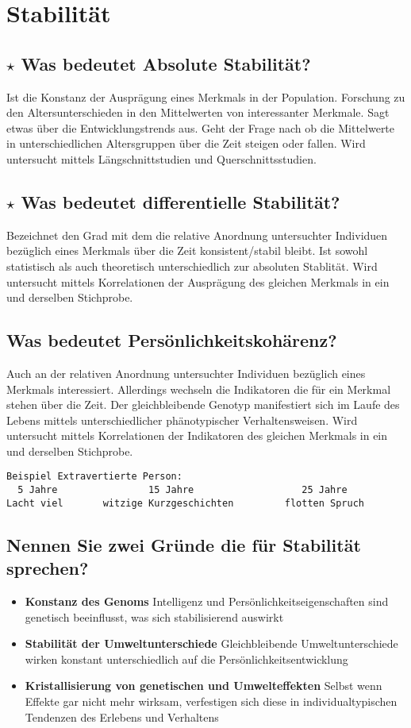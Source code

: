 \documentclass[a4paper,9pt,DIV=14]{scrartcl}
\begin{document}
\section{Stabilität}
\subsection{$\star$ Was bedeutet Absolute Stabilität?} %
Ist die Konstanz der Ausprägung eines Merkmals in der Population. Forschung zu den Altersunterschieden in den Mittelwerten von interessanter Merkmale. Sagt etwas über die Entwicklungstrends aus. Geht der Frage nach ob die Mittelwerte in unterschiedlichen Altersgruppen über die Zeit steigen oder fallen. Wird untersucht mittels Längschnittstudien und Querschnittsstudien.
\subsection{$\star$ Was bedeutet differentielle Stabilität?} %
Bezeichnet den Grad mit dem die relative Anordnung untersuchter Individuen bezüglich eines Merkmals über die Zeit konsistent/stabil bleibt. Ist sowohl statistisch als auch theoretisch unterschiedlich zur absoluten Stablität. Wird untersucht mittels Korrelationen der Ausprägung des gleichen Merkmals in ein und derselben Stichprobe.
\subsection{Was bedeutet Persönlichkeitskohärenz?}
Auch an der relativen Anordnung untersuchter Individuen bezüglich eines Merkmals interessiert. Allerdings wechseln die Indikatoren die für ein Merkmal stehen über die Zeit. Der gleichbleibende Genotyp manifestiert sich im Laufe des Lebens mittels unterschiedlicher phänotypischer Verhaltensweisen. Wird untersucht mittels Korrelationen der Indikatoren des gleichen Merkmals in ein und derselben Stichprobe.
\begin{Verbatim}[samepage=true, frame=single]
Beispiel Extravertierte Person:
  5 Jahre                15 Jahre                   25 Jahre
Lacht viel       witzige Kurzgeschichten         flotten Spruch
\end{Verbatim}
\subsection{Nennen Sie zwei Gründe die für Stabilität sprechen?}
\begin{itemize}
    \item \textbf{Konstanz des Genoms}
    Intelligenz und Persönlichkeitseigenschaften sind genetisch beeinflusst, was sich
    stabilisierend auswirkt
    \item \textbf{Stabilität der Umweltunterschiede}
    Gleichbleibende Umweltunterschiede wirken konstant unterschiedlich auf die
    Persönlichkeitsentwicklung
    \item \textbf{Kristallisierung von genetischen und Umwelteffekten}
    Selbst wenn Effekte gar nicht mehr wirksam, verfestigen sich diese in individualtypischen
    Tendenzen des Erlebens und Verhaltens
\end{itemize}
\end{document}
